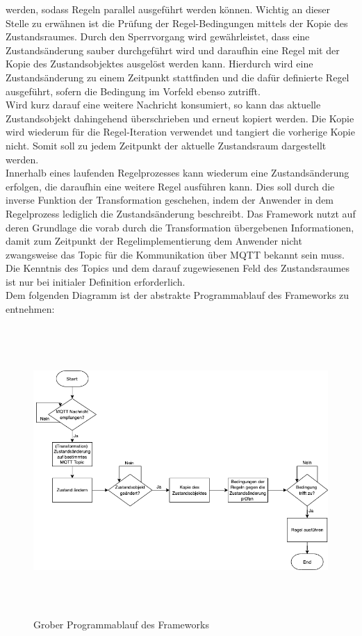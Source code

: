         werden, sodass Regeln parallel ausgeführt werden können. 
        Wichtig an dieser Stelle zu 
        erwähnen ist die Prüfung der Regel-Bedingungen mittels der Kopie des Zustandsraumes. 
        Durch den Sperrvorgang wird gewährleistet, dass eine Zustandsänderung sauber durchgeführt wird und daraufhin eine Regel mit der 
        Kopie des Zustandsobjektes ausgelöst werden kann. Hierdurch wird eine Zustandsänderung zu einem 
        Zeitpunkt stattfinden und die dafür definierte Regel ausgeführt, sofern die Bedingung im Vorfeld ebenso zutrifft. 
        \\
        Wird kurz darauf eine weitere Nachricht konsumiert, so kann das aktuelle Zustandsobjekt dahingehend überschrieben und erneut 
        kopiert werden. Die Kopie wird wiederum für die Regel-Iteration verwendet und tangiert die vorherige Kopie nicht. Somit soll 
        zu jedem Zeitpunkt der aktuelle Zustandsraum dargestellt werden. 
        \\
        \linebreak
        Innerhalb eines laufenden Regelprozesses kann wiederum eine Zustandsänderung erfolgen, die daraufhin eine weitere Regel ausführen kann. 
        Dies soll durch die inverse Funktion der Transformation geschehen, indem der 
        Anwender in dem Regelprozess lediglich die Zustandsänderung beschreibt. Das Framework nutzt auf deren Grundlage die vorab durch die Transformation 
        übergebenen Informationen, damit zum Zeitpunkt der Regelimplementierung dem Anwender nicht zwangsweise das Topic für die Kommunikation über \acs{MQTT} 
        bekannt sein muss. Die Kenntnis des Topics und dem darauf zugewiesenen Feld des Zustandsraumes ist nur bei initialer Definition erforderlich. 
        \\
        \linebreak
        Dem folgenden Diagramm ist der abstrakte Programmablauf des Frameworks zu entnehmen:
        \begin{figure}[hbt!]
            \centering
            \includegraphics[width=14cm,height=11cm,keepaspectratio]{images/Programmablauf_Framework.png}
            \caption{Grober Programmablauf des Frameworks}
            \label{fig:programmablauf_framework}
        \end{figure}
